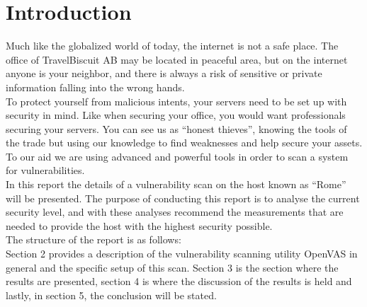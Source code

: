 \section{Introduction} \label{sec:intro}

Much like the globalized world of today, the internet is not a safe place.
The office of TravelBiscuit AB may be located in peaceful area, but on the internet anyone is your neighbor, and there is always a risk of sensitive or private information falling into the wrong hands. \\

\noindent To protect yourself from malicious intents, your servers need to be set up with security in mind.
Like when securing your office, you would want professionals securing your servers.
You can see us as ``honest thieves'', knowing the tools of the trade but using our knowledge to find weaknesses and help secure your assets.
To our aid we are using advanced and powerful tools in order to scan a system for vulnerabilities. \\

\noindent In this report the details of a vulnerability scan on the host known as “Rome” will be presented.
The purpose of conducting this report is to analyse the current security level, and with these analyses recommend the measurements that are needed to provide the host with the highest security possible. \\

\noindent The structure of the report is as follows: \\
Section 2 provides a description of the vulnerability scanning utility OpenVAS in general and the specific setup of this scan. Section 3 is the section where the results are presented, section 4 is where the discussion of the results is held and lastly, in section 5, the conclusion will be stated.
